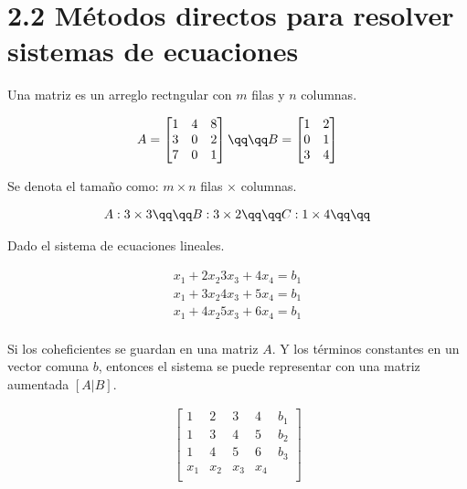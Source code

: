 \section{2.2 Métodos directos para resolver sistemas de ecuaciones}
Una matriz es un arreglo rectngular con $m$ filas y $n$ columnas.
\begin{center}
   \begin{align*}
       A = \begin{bmatrix}
            1&4&8 \\ 
            3&0&2 \\ 
            7&0&1 \\ 
       \end{bmatrix} 
        \qq \qq 
        B = \begin{bmatrix}
            1&2 \\
            0&1 \\
            3&4 \\
        \end{bmatrix} \\ 
   \end{align*}
\end{center}
Se denota el tamaño como: $m\times n$  filas $\times $ columnas.
\begin{center}
   \begin{align*}
       A: 3\times 3 \qq \qq 
       B: 3\times 2 \qq \qq 
       C: 1\times 4 \qq \qq  \\ 
   \end{align*}
\end{center}
Dado el sistema de ecuaciones lineales.
\begin{center}
   \begin{align*}
       x_1+2x_2 3x_3+4x_4=b_1 \\ 
       x_1+3x_2 4x_3+5x_4=b_1 \\ 
       x_1+4x_2 5x_3+6x_4=b_1 \\ 
   \end{align*}
\end{center}
Si los coheficientes se guardan en una matriz $A$. Y los términos constantes en un vector comuna $b$, entonces el sistema se puede representar con una matriz aumentada $[A|B]$.
\begin{center}
   \begin{align*}
       \begin{bmatrix}
           1&2&3&4 &b_1 \\ 
           1&3&4&5 &b_2 \\ 
           1&4&5&6 &b_3 \\ 
           x_1&x_2&x_3&x_4&\\ 
       \end{bmatrix}
   \end{align*}
\end{center}

